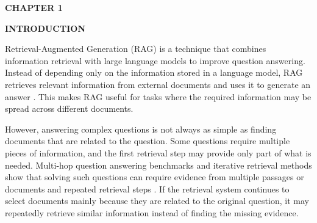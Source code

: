 \documentclass[12pt,a4paper]{report}
\newcommand{\chaptertitle}[2]{
    \begin{center}
        {\fontsize{18}{21}\selectfont\bfseries CHAPTER #1\par}
        \vspace{0.10in}
        {\fontsize{18}{21}\selectfont\bfseries #2\par}
    \end{center}
    \vspace{0.12in}
}
\begin{document}
\begin{center}

\renewcommand{\arraystretch}{1.35}


\end{center}
\clearpage






\setcounter{page}{1}
\chaptertitle{1}{INTRODUCTION}
\label{ch:1}
\justifying

Retrieval-Augmented Generation (RAG) is a technique that combines information retrieval with large language models to improve question answering. Instead of depending only on the information stored in a language model, RAG retrieves relevant information from external documents and uses it to generate an answer \cite{lewis2020rag}. This makes RAG useful for tasks where the required information may be spread across different documents.

However, answering complex questions is not always as simple as finding documents that are related to the question. Some questions require multiple pieces of information, and the first retrieval step may provide only part of what is needed. Multi-hop question answering benchmarks and iterative retrieval methods show that solving such questions can require evidence from multiple passages or documents and repeated retrieval steps \cite{yang2018hotpotqa,trivedi2022musique,yadav2020iterative}. If the retrieval system continues to select documents mainly because they are related to the original question, it may repeatedly retrieve similar information instead of finding the missing evidence.
\end{document}
